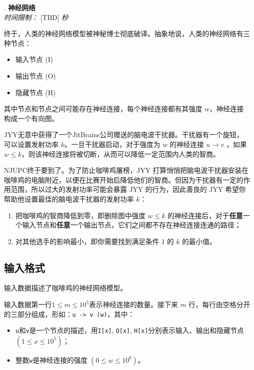 \addtocounter{ProblemNo}{1}
\renewcommand{\ProblemName}{神经网络}
\begin{center}
\huge{. \textbf{\ProblemName}} \\ [0.8cm]
\large{\textit{时间限制：} [TBD] \textit{秒}} \\ [1cm]
\end{center}

终于，人类的神经网络模型被神秘博士彻底破译。抽象地说，人类的神经网络有三种节点：

\begin{itemize}
\item 输入节点 (I)
\item 输出节点 (O)
\item 隐藏节点 (H)
\end{itemize}

其中节点和节点之间可能存在神经连接，每个神经连接都有其强度 $w$，神经连接构成一个有向图。

JYY无意中获得了一个JitBrains公司赠送的脑电波干扰器。干扰器有一个旋钮，可以设置发射功率 $k$。一旦干扰器启动，对于强度为 $w$ 的神经连接 $u \to v$ ，如果 $w \le k$，则该神经连接将被切断，从而可以降低一定范围内人类的智商。

NJUPC终于要到了。为了防止咖啡鸡屠榜，JYY 打算悄悄把脑电波干扰器安装在咖啡鸡的电脑附近，以便在比赛开始后降低他们的智商。但因为干扰器有一定的作用范围，所以过大的发射功率可能会暴露 JYY 的行为，因此善良的 JYY 希望你帮助他设置最佳的脑电波干扰器的发射功率 $k$：

\begin{enumerate}
\item 把咖啡鸡的智商降低到零，即删除图中强度 $w \le k$ 的神经连接后，对于\textbf{任意}一个输入节点和\textbf{任意}一个输出节点，它们之间都不存在神经连接连通的路径；
\item 对其他选手的影响最小，即你需要找到满足条件 1 的 $k$ 的最小值。
\end{enumerate}

\subsection*{输入格式}

输入数据描述了咖啡鸡的神经网络模型。

输入数据第一行$1\le m \le 10^5$表示神经连接的数量。接下来 $m$ 行，每行由空格分开的三部分组成，形如：\texttt{u -> v (w)}，其中：

\begin{itemize}
\item \texttt{u}和\texttt{v}是一个节点的描述，用\texttt{I[x]}, \texttt{O[x]}, \texttt{H[x]}分别表示输入、输出和隐藏节点 $(1 \le x \le 10^5)$；
\item 整数\texttt{w}是神经连接的强度 $(0\le w\le 10^6)$。
\end{itemize}

